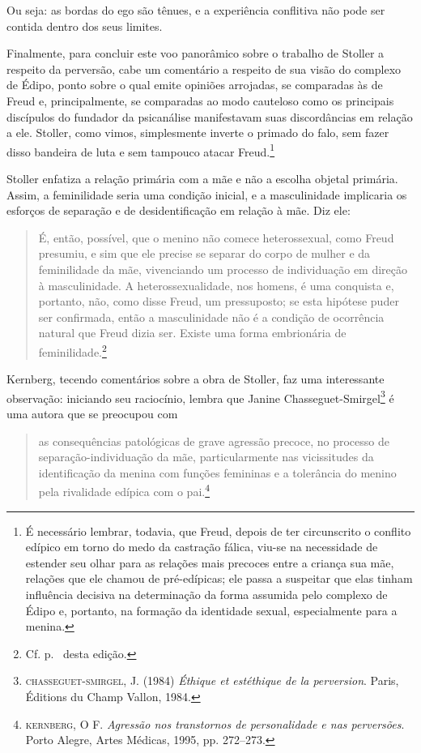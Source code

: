 Ou seja: as bordas do ego são tênues, e a experiência conflitiva não pode ser 
contida dentro dos seus limites.

Finalmente, para concluir este voo panorâmico sobre o trabalho de Stoller a
respeito da perversão, cabe um comentário a respeito de sua visão do
complexo de Édipo, ponto sobre o qual emite opiniões arrojadas, se
comparadas às de Freud e, principalmente, se comparadas ao modo cauteloso
como os principais discípulos do fundador da psicanálise manifestavam suas
discordâncias em relação a ele. Stoller, como vimos, simplesmente inverte o
primado do falo, sem fazer disso bandeira de luta e sem tampouco atacar
Freud.\footnote{ É necessário lembrar, todavia, que Freud, depois de ter
circunscrito o conflito edípico em torno do medo da castração fálica,
viu-se na necessidade de estender seu olhar para as relações mais precoces
entre a criança sua mãe, relações que ele chamou de pré-edípicas; ele passa
a suspeitar que elas tinham influência decisiva na determinação da forma
assumida pelo complexo de Édipo e, portanto, na formação da identidade
sexual, especialmente para a menina.}

Stoller enfatiza a relação primária com a mãe e não a escolha objetal
primária. Assim, a feminilidade seria uma condição inicial, e a
masculinidade implicaria os esforços de separação e de desidentificação em
relação à mãe. Diz ele: 

\begin{quote}
É, então, possível, que o menino não comece heterossexual,
como Freud presumiu,  e sim que ele precise se separar do corpo de
mulher e da feminilidade da mãe, vivenciando um processo de
individuação em direção à masculinidade. A heterossexualidade, nos
homens, é uma conquista e, portanto, não, como disse Freud, um
pressuposto; se esta hipótese puder ser confirmada, então a
masculinidade não é a condição de ocorrência natural que Freud dizia
ser. Existe uma forma embrionária de feminilidade.\footnote{ Cf. p.~\pageref{cita1} desta edição.}
\end{quote}

Kernberg, tecendo comentários sobre a obra de Stoller, faz uma
interessante observação: iniciando seu raciocínio, lembra que Janine
Chasseguet-Smirgel\footnote{ \textsc{chasseguet-smirgel}, J. (1984) \textit{Éthique
et estéthique de la perversion}. Paris, Éditions du Champ Vallon, 1984.} é
uma autora que se preocupou com 

\begin{quote}
as consequências patológicas de grave
agressão precoce, no processo de separação-individuação da mãe,
particularmente nas vicissitudes da identificação da menina com funções
femininas e a tolerância do menino pela rivalidade edípica com o pai.\footnote{ \textsc{kernberg}, 
O F. \textit{Agressão nos transtornos de personalidade e nas perversões}. Porto Alegre, Artes Médicas, 1995,
pp. 272--273.}
\end{quote}


